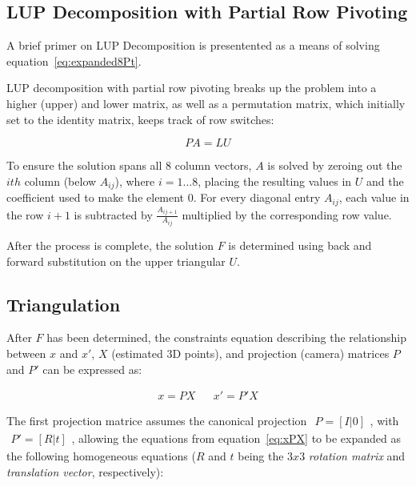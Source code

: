 \documentclass[12pt]{article}
\begin{document}
\subsection{LUP Decomposition with Partial Row Pivoting}
A brief primer on LUP Decomposition is presentented as a means of solving equation~\eqref{eq:expanded8Pt}.

LUP decomposition with partial row pivoting breaks up the problem into a higher (upper) and lower matrix, as well as a permutation matrix, which initially set to the identity matrix, keeps track of row switches:

\begin{equation}
    PA=LU
\end{equation}

To ensure the solution spans all 8 column vectors, $A$ is solved by zeroing out the $ith$ column (below $A_{ij}$), where $i = 1 ... 8$, placing the resulting values in $U$ and the coefficient used to make the element 0. For every diagonal entry $A_{ij}$, each value in the row $i+1$ is subtracted by $\frac{A_{ij+1}}{A_{ij}}$ multiplied by the corresponding row value.

After the process is complete, the solution $F$ is determined using back and forward substitution on the upper triangular $U$. 

\subsection{Triangulation}
After $F$ has been determined, the constraints equation describing the relationship between $x$ and $x'$, $X$ (estimated 3D points), and projection (camera) matrices $P$ and $P'$ can be expressed as:

\begin{align}\label{eq:xPX}
    x=PX
&&
    x'=P'X
\end{align}

The first projection matrice assumes the canonical projection $\begin{matrix}P=[I|0]\end{matrix}$, with $\begin{matrix}P'=[R|t]\end{matrix}$, allowing the equations from equation~\eqref{eq:xPX} to be expanded as the following homogeneous equations ($R$ and $t$ being the $3x3$ \textit{rotation matrix} and \textit{translation vector}, respectively):
\end{document}
